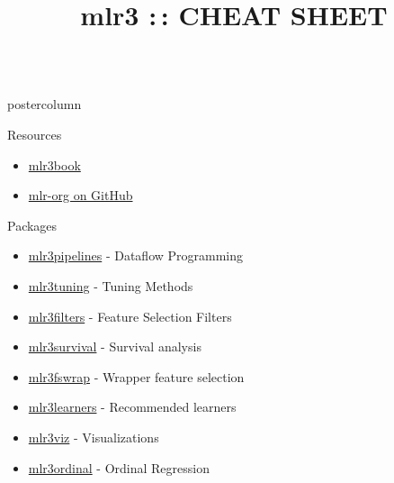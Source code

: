 \documentclass{beamer}
\title{mlr3 :\,: CHEAT SHEET} %
\newlength{\columnheight} %
\begin{document}
\begin{frame}[fragile]{}
\begin{columns}
	\begin{column}{.245\textwidth}
		\begin{beamercolorbox}[center]{postercolumn}
			\begin{minipage}{.98\textwidth}
				\parbox[t][\columnheight]{\textwidth}{
					\begin{myblock}{Resources}
						\begin{itemize}
							\item \href{https://mlr3book.mlr-org.com/index.html}{mlr3book}
							\item \href{https://github.com/mlr-org}{mlr-org on GitHub} 
						\end{itemize}
					\end{myblock}
						\begin{myblock}{Packages}
										\vfill
						\begin{itemize}
							\item \href{https://github.com/mlr-org/mlr3pipelines}{mlr3pipelines} - Dataflow Programming
							\item \href{https://github.com/mlr-org/mlr3tuning}{mlr3tuning} - Tuning Methods
							\item \href{https://github.com/mlr-org/mlr3filters}{mlr3filters} - Feature Selection Filters
							\item \href{https://github.com/mlr-org/mlr3survival}{mlr3survival} - Survival analysis
							\item \href{https://github.com/mlr-org/mlr3fswrap}{mlr3fswrap} - Wrapper feature selection
							\item \href{https://github.com/mlr-org/mlr3learners}{mlr3learners} - Recommended learners
							\item \href{https://github.com/mlr-org/mlr3viz}{mlr3viz} - Visualizations
							\item \href{https://github.com/mlr-org/mlr3ordinal}{mlr3ordinal} - Ordinal Regression
						\end{itemize}
					\end{myblock}

}
\end{minipage}
\end{beamercolorbox}
\end{column}
\end{columns}
\end{frame}
\end{document}
